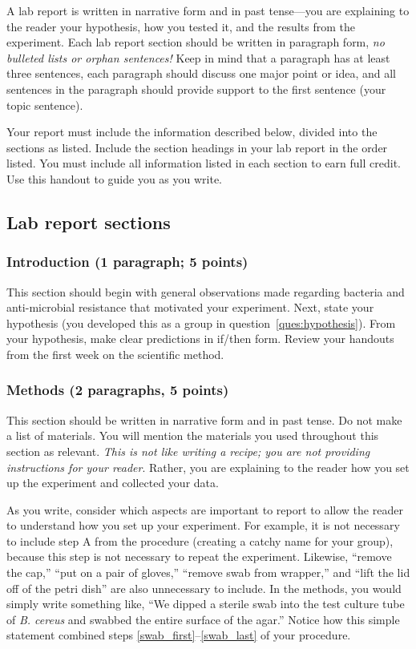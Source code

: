 \documentclass[12pt]{exam}
\begin{document}
A lab report is written in narrative form and in past tense—you are
explaining to the reader your hypothesis, how you tested it, and the
results from the experiment. Each lab report section should be written
in paragraph form, \emph{no bulleted lists or orphan sentences!} Keep in
mind that a paragraph has at least three sentences, each paragraph should
discuss one major point or idea, and all sentences in the paragraph
should provide support to the first sentence (your topic sentence).

Your report must include the information described below, divided into the
sections as listed. Include the section headings in your lab report in the order listed. You must 
include all information listed in each section to earn full credit. 
Use this handout to guide you as you write.

\subsection*{Lab report sections}

\subsubsection*{Introduction (1 paragraph; 5 points)} 

This section should begin with general observations made regarding
bacteria and anti-microbial resistance that motivated your experiment.
Next, state your hypothesis (you developed this as a group in question~\ref{ques:hypothesis}).
From your hypothesis, make clear predictions in if/then form. Review your handouts from
the first week on the scientific method.

\subsubsection*{Methods (2 paragraphs, 5 points)} 

This section should be written in narrative form and in past tense. Do
not make a list of materials. You will mention the materials you used
throughout this section as relevant. \emph{This is not like writing a
recipe; you are not providing instructions for your reader}. Rather, you
are explaining to the reader how you set up the experiment and collected
your data.

As you write, consider which aspects are important to report to allow
the reader to understand how you set up your experiment. For example, it
is not necessary to include step A from the procedure (creating a catchy
name for your group), because this step is not necessary to repeat the
experiment. Likewise, ``remove the cap,'' ``put on a pair of
gloves,'' ``remove swab from wrapper,'' and ``lift the lid off of the petri
dish'' are also unnecessary to include. In the methods, you would simply
write something like, ``We dipped a sterile swab into the test culture
tube of \emph{B. cereus} and swabbed the entire surface of the agar.''
Notice how this simple statement combined steps \ref{swab_first}–\ref{swab_last} of your procedure.
\end{document}

